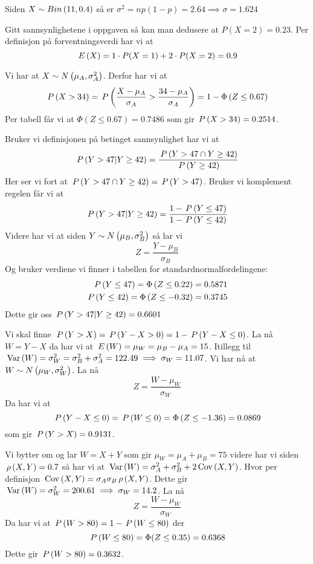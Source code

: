 
\oppgave
Siden $X\sim Bin\left(11, 0.4\right)$ så er $\sigma^2 = np(1 - p) = 2.64 \implies \sigma = 1.624$

\oppgave
Gitt sannsynlighetene i oppgaven så kan man dedusere at $P(X = 2) = 0.23$. Per definisjon på forventningsverdi har vi at
$$
\,E\left(X\right) = 1\cdot P(X = 1) + 2\cdot P(X = 2) = 0.9
$$

\oppgave
\deloppgave
Vi har at $X\sim N\left(\mu_A, \sigma_A^2\right)$. Derfor har vi at
$$
\,P\left(X > 34\right) = \,P\left(\frac{X - \mu_A}{\sigma_A} > \frac{34 - \mu_A}{\sigma_A}\right) = 1 - \Phi\left(Z \leq 0.67\right)
$$
Per tabell får vi at $\Phi\left(Z \leq 0.67\right) = 0.7486$ som gir $\,P\left(X > 34\right) = 0.2514$.

\deloppgave
Bruker vi definisjonen på betinget sannsynlighet har vi at
$$
\,P\left(Y > 47 | Y\geq 42\right) = \frac{\,P\left(Y > 47 \cap Y \geq 42\right)}{\,P\left(Y \geq 42\right)}
$$
Her ser vi fort at $\,P\left(Y > 47 \cap Y \geq 42\right) = \,P\left(Y > 47\right)$. Bruker vi komplement regelen får vi at
$$
\,P\left(Y > 47 | Y\geq 42\right) = \frac{1-\,P\left(Y \leq 47\right)}{1 - \,P\left(Y \leq 42\right)}
$$
Videre har vi at siden $Y\sim N\left(\mu_B, \sigma_B^2\right)$ så lar vi
$$
Z = \frac{Y - \mu_B}{\sigma_B}
$$
Og bruker verdiene vi finner i tabellen for standardnormalfordelingene:
\begin{align*}
	\,P\left(Y \leq 47\right) = \Phi\left(Z \leq 0.22\right) &= 0.5871\\
	\,P\left(Y \leq 42\right) = \Phi\left(Z \leq -0.32\right) &= 0.3745
\end{align*}
Dette gir oss $\,P\left(Y > 47 | Y\geq 42\right) = 0.6601$

\deloppgave
Vi skal finne $\,P\left(Y > X\right) = \,P\left(Y - X > 0\right) = 1 - \,P\left(Y - X \leq 0\right)$. La nå $W = Y - X$ da har vi at $\,E\left(W\right) = \mu_W = \mu_B - \mu_A = 15$. Itillegg til $\, \mathrm{Var}\left(W\right) = \sigma_W^2 = \sigma_B^2 + \sigma_A^2 = 122.49 \implies \sigma_W = 11.07$. Vi har nå at $W\sim N\left(\mu_W, \sigma_W^2\right)$. La nå
$$
Z = \frac{W - \mu_W}{\sigma_W}
$$
Da har vi at 
$$
\,P\left(Y - X \leq 0\right) = \,P\left(W \leq 0\right) = \Phi\left(Z \leq -1.36\right) = 0.0869
$$
som gir $\,P\left(Y > X\right) = 0.9131$.

\deloppgave
Vi bytter om og lar $W = X + Y$ som gir $\mu_W = \mu_A + \mu_B = 75$ videre har vi siden $\,\rho\left(X, Y\right) = 0.7$ så har vi at $\, \mathrm{Var}\left(W\right) = \sigma_A^2 + \sigma_B^2 + 2\,\mathrm{Cov}\left(X, Y\right)$. Hvor per definisjon $\,\mathrm{Cov}\left(X, Y\right) = \sigma_A\sigma_B\,\rho\left(X, Y\right)$. Dette gir $\, \mathrm{Var}\left(W\right) = \sigma_W^2 = 200.61 \implies \sigma_W = 14.2$. La nå
$$
Z = \frac{W - \mu_W}{\sigma_W}
$$
Da har vi at $\,P\left(W > 80\right) = 1 - \,P\left(W \leq 80\right)$ der
$$
\,P\left(W \leq 80\right) = \Phi(Z \leq 0.35) = 0.6368
$$
Dette gir $\,P\left(W > 80\right) = 0.3632$.


